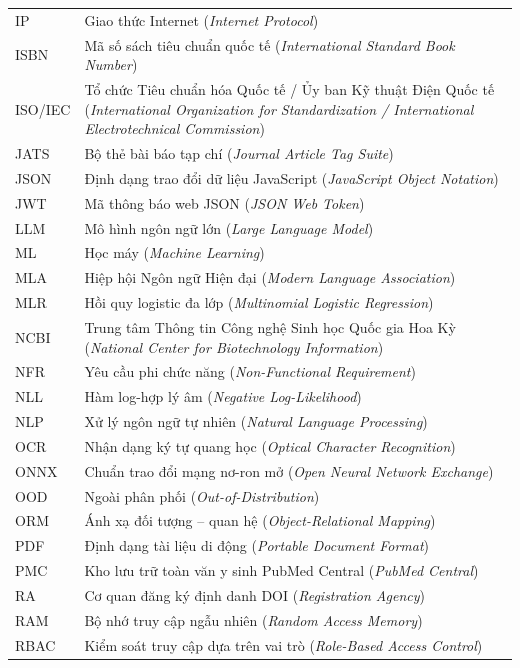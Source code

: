 {\begin{longtable}{P{0.22}P{0.78}}
IP & Giao thức Internet (\textit{Internet Protocol}) \\
ISBN & Mã số sách tiêu chuẩn quốc tế (\textit{International Standard Book Number}) \\
ISO/IEC & Tổ chức Tiêu chuẩn hóa Quốc tế / Ủy ban Kỹ thuật Điện Quốc tế (\textit{International Organization for Standardization / International Electrotechnical Commission}) \\
JATS & Bộ thẻ bài báo tạp chí (\textit{Journal Article Tag Suite}) \\
JSON & Định dạng trao đổi dữ liệu JavaScript (\textit{JavaScript Object Notation}) \\
JWT & Mã thông báo web JSON (\textit{JSON Web Token}) \\
LLM & Mô hình ngôn ngữ lớn (\textit{Large Language Model}) \\
ML & Học máy (\textit{Machine Learning}) \\
MLA & Hiệp hội Ngôn ngữ Hiện đại (\textit{Modern Language Association}) \\
MLR & Hồi quy logistic đa lớp (\textit{Multinomial Logistic Regression}) \\
NCBI & Trung tâm Thông tin Công nghệ Sinh học Quốc gia Hoa Kỳ (\textit{National Center for Biotechnology Information}) \\
NFR & Yêu cầu phi chức năng (\textit{Non-Functional Requirement}) \\
NLL & Hàm log-hợp lý âm (\textit{Negative Log-Likelihood}) \\
NLP & Xử lý ngôn ngữ tự nhiên (\textit{Natural Language Processing}) \\
OCR & Nhận dạng ký tự quang học (\textit{Optical Character Recognition}) \\
ONNX & Chuẩn trao đổi mạng nơ-ron mở (\textit{Open Neural Network Exchange}) \\
OOD & Ngoài phân phối (\textit{Out-of-Distribution}) \\
ORM & Ánh xạ đối tượng -- quan hệ (\textit{Object-Relational Mapping}) \\
PDF & Định dạng tài liệu di động (\textit{Portable Document Format}) \\
PMC & Kho lưu trữ toàn văn y sinh PubMed Central (\textit{PubMed Central}) \\
RA & Cơ quan đăng ký định danh DOI (\textit{Registration Agency}) \\
RAM & Bộ nhớ truy cập ngẫu nhiên (\textit{Random Access Memory}) \\
RBAC & Kiểm soát truy cập dựa trên vai trò (\textit{Role-Based Access Control}) \\

\end{longtable}}

